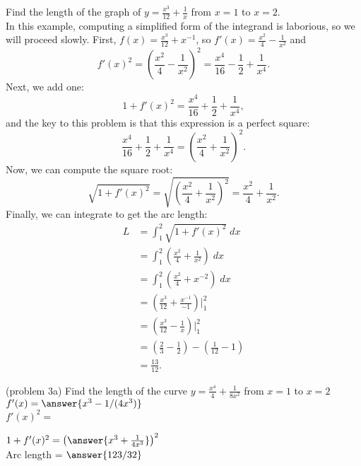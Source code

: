 \documentclass[handout]{ximera}
\begin{document}
\begin{example}[example 3] Find the length of the graph of 
$y = \frac{x^3}{12} + \frac{1}{x}$ from $x = 1$ to $x = 2$.\\
In this example, computing a simplified form of the integrand is laborious, so we will proceed slowly.
First, $f(x) = \frac{x^3}{12} + x^{-1}$, so $f'(x) = \frac{x^2}{4} - \frac{1}{x^2}$ and
\[
f'(x)^2 = \left( \frac{x^2}{4} - \frac{1}{x^2} \right)^2 = \frac{x^4}{16} - \frac12 + \frac{1}{x^4}.
\]
Next, we add one:
\[
1 + f'(x)^2 = \frac{x^4}{16} + \frac12 + \frac{1}{x^4},
\]
and the key to this problem is that this expression is a perfect square:
\[
\frac{x^4}{16} + \frac12 + \frac{1}{x^4} = \left( \frac{x^2}{4} + \frac{1}{x^2}\right)^2.
\]
Now, we can compute the square root:
\[
\sqrt{1+f'(x)^2} = \sqrt{\left( \frac{x^2}{4} + \frac{1}{x^2}\right)^2 } = \frac{x^2}{4} + \frac{1}{x^2}.
\]
Finally, we can integrate to get the arc length:
\begin{align*}
L &= \int_1^2 \sqrt{1+f'(x)^2} \; dx \\
  &= \int_1^2 \left(\frac{x^2}{4} + \frac{1}{x^2} \right) \; dx  \\
  &= \int_1^2 \left(\frac{x^2}{4} + x^{-2} \right) \; dx \\
  &= \left(\frac{x^3}{12} + \frac{x^{-1}}{-1} \right) \bigg|_1^2 \\
  &= \left(\frac{x^3}{12} - \frac{1}{x} \right) \bigg|_1^2 \\
  &= \left(\frac23 - \frac12\right) - \left(\frac{1}{12} - 1\right) \\
  &= \frac{13}{12}.  
\end{align*}
\end{example}




\begin{problem}(problem 3a)
Find the length of the curve $\displaystyle{y = \frac{x^4}{4} + \frac{1}{8x^2}}$ from $x = 1$ to $x = 2$\\

$f'(x) = \answer{x^3 - 1/(4x^3)}$\\

$f'(x)^2 =$

\begin{multipleChoice}
\end{multipleChoice}

$1+f'(x)^2 = \left(\answer{x^3 + \frac{1}{4x^3}}\right)^2$\\

Arc length = $\answer{123/32}$
\end{problem}
\end{document}
